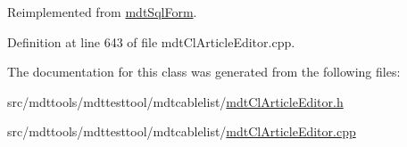 Reimplemented from \hyperlink{classmdt_sql_form_a27fe6e45aa5d4d7782aad9833e6de20b}{mdt\-Sql\-Form}.



Definition at line 643 of file mdt\-Cl\-Article\-Editor.\-cpp.



The documentation for this class was generated from the following files\-:\begin{DoxyCompactItemize}
\item 
src/mdttools/mdttesttool/mdtcablelist/\hyperlink{mdt_cl_article_editor_8h}{mdt\-Cl\-Article\-Editor.\-h}\item 
src/mdttools/mdttesttool/mdtcablelist/\hyperlink{mdt_cl_article_editor_8cpp}{mdt\-Cl\-Article\-Editor.\-cpp}\end{DoxyCompactItemize}
